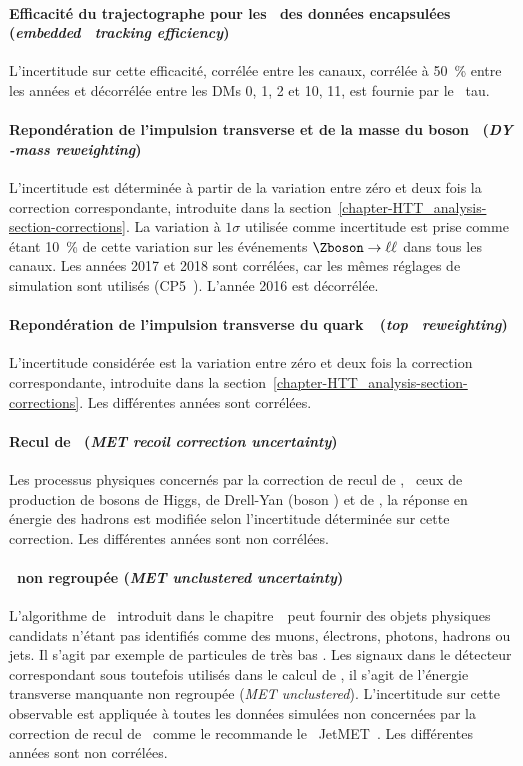 \paragraph{Efficacité du trajectographe pour les \tauh\ des données encapsulées (\emph{embedded \tauh\ tracking efficiency})}
L'incertitude sur cette efficacité,
corrélée entre les canaux,
corrélée à \SI{50}{\%} entre les années et
décorrélée entre les DMs 0, 1, 2 et 10, 11, 
est fournie par le \POG\ tau.
\paragraph{Repondération de l'impulsion transverse et de la masse du boson \Zboson\ (\emph{DY \pT-mass reweighting})}
L'incertitude est déterminée à partir de la variation entre zéro et deux fois la correction correspondante, introduite dans la section~\ref{chapter-HTT_analysis-section-corrections}.
La variation à $1\sigma$ utilisée comme incertitude est prise comme étant \SI{10}{\%} de cette variation sur les événements $\Zboson\to\ell\ell$ dans tous les canaux.
Les années 2017 et 2018 sont corrélées, car les mêmes réglages de simulation sont utilisés (CP5~\cite{tunes_2019}).
L'année 2016 est décorrélée.
\paragraph{Repondération de l'impulsion transverse du quark~\quarkt\ (\emph{top \pT\ reweighting})}
L'incertitude considérée est la variation entre zéro et deux fois la correction correspondante, introduite dans la section~\ref{chapter-HTT_analysis-section-corrections}.
Les différentes années sont corrélées.
\paragraph{Recul de \MET\ (\emph{MET recoil correction uncertainty})}
Les processus physiques concernés par la correction de recul de \MET,
\ie\ ceux de production de bosons de Higgs, de Drell-Yan (boson \Zboson) et de \Wjets,
la réponse en énergie des hadrons est modifiée selon l'incertitude déterminée sur cette correction.
Les différentes années sont non corrélées.
\paragraph{\MET\ non regroupée (\emph{MET unclustered uncertainty})}
L'algorithme de \PF\ introduit dans le chapitre~\ peut fournir des objets physiques candidats n'étant pas identifiés comme des muons, électrons, photons, hadrons ou jets.
Il s'agit par exemple de particules de très bas \pT.
Les signaux dans le détecteur correspondant sous toutefois utilisés dans le calcul de \MET, il s'agit de l'énergie transverse manquante non regroupée (\emph{MET unclustered}).
L'incertitude sur cette observable est appliquée à toutes les données simulées non concernées par la correction de recul de \MET\ comme le recommande le \POG\ JetMET~\cite{MET_corrections}.
Les différentes années sont non corrélées.
